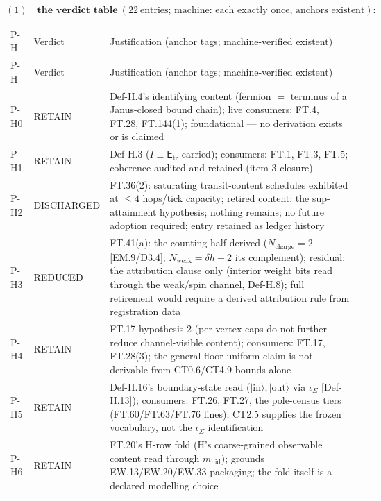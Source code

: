 \documentclass[11pt,openany]{report}
\theoremstyle{canonplain}
\theoremstyle{canondef}
\begin{document}
\[
(1)\quad\textbf{the verdict table}\ (22\ \text{entries; machine: each exactly once, anchors existent}):
\]

{\scriptsize\setlength{\tabcolsep}{4pt}
\begin{longtable}{>{\raggedright\arraybackslash}p{}|>{\raggedright\arraybackslash}p{}|>{\raggedright\arraybackslash}p{}}
\toprule
P-H & Verdict & Justification (anchor tags; machine-verified existent) \\
\addlinespace[2pt]
\midrule
\endfirsthead
\toprule
P-H & Verdict & Justification (anchor tags; machine-verified existent) \\
\addlinespace[2pt]
\midrule
\endhead
\bottomrule
\endlastfoot
P-H0 & RETAIN & Def-H.4's identifying content (fermion $=$ terminus of a Janus-closed bound chain); live consumers: FT.4, FT.28, FT.144(1); foundational — no derivation exists or is claimed \\
P-H1 & RETAIN & Def-H.3 ($I\equiv\mathsf E_{\mathrm{tr}}$ carried); consumers: FT.1, FT.3, FT.5; coherence-audited and retained (item 3 closure) \\
P-H2 & DISCHARGED & FT.36(2): saturating transit-content schedules exhibited at $\le\allowbreak 4$ hops/tick capacity; retired content: the sup-attainment hypothesis; nothing remains; no future adoption required; entry retained as ledger history \\
P-H3 & REDUCED & FT.41(a): the counting half derived ($N_{\mathrm{charge}}=\allowbreak 2$ [EM.9/D3.4]; $N_{\mathrm{weak}}=\allowbreak \delta h-2$ its complement); residual: the attribution clause only (interior weight bits read through the weak/spin channel, Def-H.8); full retirement would require a derived attribution rule from registration data \\
P-H4 & RETAIN & FT.17 hypothesis 2 (per-vertex caps do not further reduce channel-visible content); consumers: FT.17, FT.28(3); the general floor-uniform claim is not derivable from CT0.6/CT4.9 bounds alone \\
P-H5 & RETAIN & Def-H.16's boundary-state read ($|\mathrm{in}\rangle,\allowbreak |\mathrm{out}\rangle$ via $\iota_\Sigma$ [Def-H.13]); consumers: FT.26, FT.27, the pole-census tiers (FT.60/FT.63/FT.76 lines); CT2.5 supplies the frozen vocabulary, not the $\iota_\Sigma$ identification \\
P-H6 & RETAIN & FT.20's H-row fold (H's coarse-grained observable content read through $m_{\mathrm{hid}}$); grounds EW.13/EW.20/EW.33 packaging; the fold itself is a declared modelling choice \\

\end{longtable}}
\end{document}
